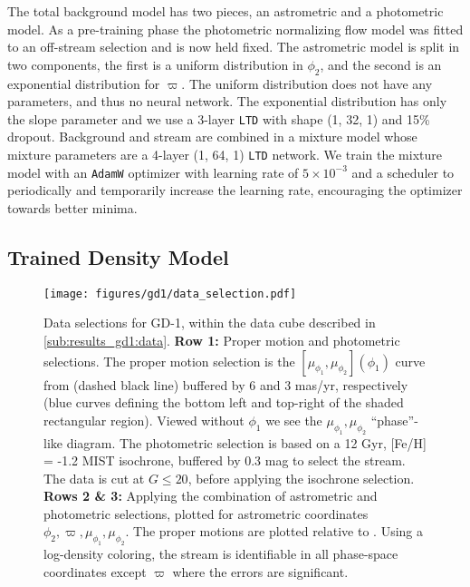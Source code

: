 \documentclass[twocolumn]{aastex631}
\newcommand{\stream}[1]{#1}
\newcommand{\parallax}{\varpi}
\begin{document}
        The total background model has two pieces, an astrometric and a
        photometric model.  As a pre-training phase the photometric normalizing
        flow model was fitted to an off-stream selection and is now held fixed.
        The astrometric model is split in two components, the first is a uniform
        distribution in $\phi_2$, and the second is an exponential distribution
        for $\parallax$.  The uniform distribution does not have any parameters,
        and thus no neural network.  The exponential distribution has only the
        slope parameter and we use a 3-layer \texttt{LTD} with shape (1, 32, 1)
        and 15\% dropout. Background and stream are combined in a mixture model
        whose mixture parameters are a 4-layer (1, 64, 1) \texttt{LTD} network.
        We train the mixture model with an \texttt{AdamW} optimizer with
        learning rate of $5\times10^{-3}$ and a scheduler to periodically and
        temporarily increase the learning rate, encouraging the optimizer
        towards better minima.

    \newpage
    \subsection{Trained Density Model} \label{sub:results_mock:results}

    \begin{figure*}[ht]
        \centering
        \texttt{[image: figures/gd1/data\_selection.pdf]}
        \caption{%
            Data selections for \stream{GD-1}, within the data cube described in
            \autoref{sub:results_gd1:data}.
            \textbf{Row 1:}
            Proper motion and photometric selections.  
            The proper motion selection is the $[\mu_{\phi_1},
            \mu_{\phi_2}](\phi_1)$ curve from  (dashed
            black line) buffered by $6$ and $3$ mas/yr, respectively (blue
            curves defining the bottom left and top-right of the shaded
            rectangular region). Viewed without $\phi_1$ we see the
            $\mu_{\phi_1}, \mu_{\phi_2}$ ``phase''-like diagram. The photometric
            selection is based on a 12 Gyr, [Fe/H] = -1.2 MIST isochrone,
            buffered by 0.3 mag to select the stream. The data is cut at
            $G\leq20$, before applying the isochrone selection.
            \textbf{Rows 2 \& 3:}
            Applying the combination of astrometric and photometric selections,
            plotted for astrometric coordinates $\phi_2, \parallax,
            \mu_{\phi_1}, \mu_{\phi_2}$.  The proper motions are plotted
            relative to . Using a log-density coloring,
            the stream is identifiable in all phase-space coordinates except
            $\parallax$ where the errors are significant.  }
        \label{fig:gd1-data_selection}
    \end{figure*}
\end{document}
